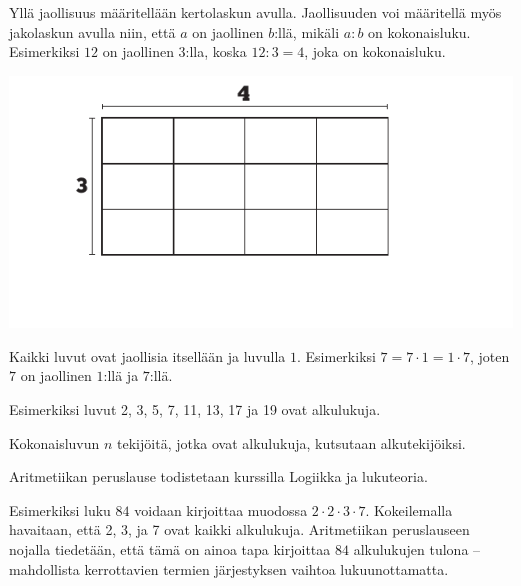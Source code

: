     
    Yllä jaollisuus määritellään kertolaskun avulla. Jaollisuuden voi määritellä myös jakolaskun avulla niin, että $a$ on jaollinen $b$:llä, mikäli $a:b$ on kokonaisluku. Esimerkiksi $12$ on jaollinen $3$:lla, koska $12:3 = 4$, joka on kokonaisluku.
   
    \begin{center}
     \includegraphics[scale=0.85]{01-luvut/kuvia/Kuva2-4-3x4.pdf}
    \end{center}
    
    Kaikki luvut ovat jaollisia itsellään ja luvulla $1$. Esimerkiksi $7=7 \cdot 1=1 \cdot 7$, joten $7$ on jaollinen $1$:llä ja $7$:llä.
    
    
    Esimerkiksi luvut 2, 3, 5, 7, 11, 13, 17 ja 19 ovat alkulukuja.
    
    Kokonaisluvun $n$ tekijöitä, jotka ovat alkulukuja, kutsutaan alkutekijöiksi.
    
    
   Aritmetiikan peruslause todistetaan kurssilla Logiikka ja lukuteoria.
    
    Esimerkiksi luku $84$ voidaan kirjoittaa muodossa $2\cdot 2\cdot 3\cdot 7$. Kokeilemalla havaitaan, että 2, 3, ja 7 ovat kaikki alkulukuja. Aritmetiikan peruslauseen nojalla tiedetään, että tämä on ainoa tapa kirjoittaa $84$ alkulukujen tulona -- mahdollista kerrottavien termien järjestyksen vaihtoa lukuunottamatta.
    

